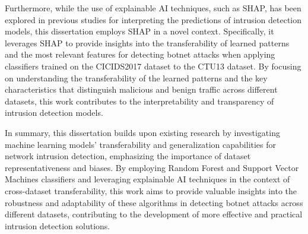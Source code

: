 Furthermore, while the use of explainable AI techniques, such as SHAP, has been explored in previous studies for interpreting the predictions of intrusion detection models, this dissertation employs SHAP in a novel context. Specifically, it leverages SHAP to provide insights into the transferability of learned patterns and the most relevant features for detecting botnet attacks when applying classifiers trained on the CICIDS2017 dataset to the CTU13 dataset. By focusing on understanding the transferability of the learned patterns and the key characteristics that distinguish malicious and benign traffic across different datasets, this work contributes to the interpretability and transparency of intrusion detection models.

In summary, this dissertation builds upon existing research by investigating machine learning models’ transferability and generalization capabilities for network intrusion detection, emphasizing the importance of dataset representativeness and biases. By employing Random Forest and Support Vector Machines classifiers and leveraging explainable AI techniques in the context of cross-dataset transferability, this work aims to provide valuable insights into the robustness and adaptability of these algorithms in detecting botnet attacks across different datasets, contributing to the development of more effective and practical intrusion detection solutions.